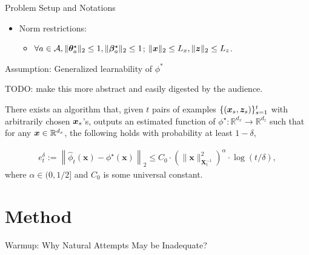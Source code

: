 \documentclass[10pt, xcolor={dvipsnames,x11names},compress]{beamer}
\begin{document}
\begin{frame}[label=Background]{Problem Setup and Notations}
\begin{itemize}
\begin{itemize}
        \item Norm restrictions: 
        \begin{itemize}
            \item $\forall a \in {\mathcal{A}}, \|{\bm{\theta}}_a^\star\|_2\leq 1, \|{\bm{\beta}}_{a}^\star\|_2\leq 1 $; $\|{\bm{x}}\|_2\leq L_x, \|{\bm{z}}\|_2 \leq L_z$.
        \end{itemize}
        
    \end{itemize}
\end{itemize}

\end{frame}



\begin{frame}{Assumption: Generalized learnability of $\phi^*$}

TODO: make this more abstract and easily digested by the audience.

There exists an algorithm that, given $t$ pairs of examples $\{({\bm{x}}_s, {\bm{z}}_s)\}_{s=1}^t$ with  arbitrarily chosen ${\bm{x}}_s$'s,   outputs an estimated function of $\phi^\star: \mathbb{R}^{d_x} \rightarrow \mathbb{R}^{d_z}$ such that for any ${\bm{x}}\in \mathbb{R}^{d_x}$,  the following holds with probability at least $1-\delta$, 

\begin{align}
     e_t^\delta:=\left\|\widehat{\phi}_t(\boldsymbol{x})-\phi^{\star}(\boldsymbol{x})\right\|_2 \leq C_0 \cdot\left(\|\boldsymbol{x}\|_{\boldsymbol{X}_t^{-1}}^2\right)^\alpha \cdot \log (t / \delta), \nonumber
\end{align}
where $\alpha \in (0, 1/2]$ and $C_0$ is some universal constant. 

\end{frame}


\section{Method}

\begin{frame}[label=warmup]{Warmup: Why Natural Attempts May be Inadequate?}

\end{frame}
\end{document}
